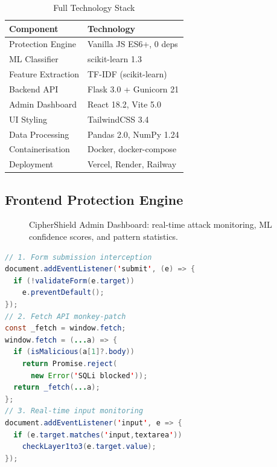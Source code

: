 \documentclass[10pt,twocolumn]{article}
\begin{document}
\begin{table}[H]
\centering
\caption{Full Technology Stack}
\label{tab:stack}
\small
\setlength{\tabcolsep}{4pt}
\begin{tabular}{@{}ll@{}}
\toprule
\textbf{Component} & \textbf{Technology} \\
\midrule
Protection Engine  & Vanilla JS ES6+, 0 deps \\
ML Classifier      & scikit-learn 1.3 \\
Feature Extraction & TF-IDF (scikit-learn) \\
Backend API        & Flask 3.0 + Gunicorn 21 \\
Admin Dashboard    & React 18.2, Vite 5.0 \\
UI Styling         & TailwindCSS 3.4 \\
Data Processing    & Pandas 2.0, NumPy 1.24 \\
Containerisation   & Docker, docker-compose \\
Deployment         & Vercel, Render, Railway \\
\bottomrule
\end{tabular}
\end{table}

\subsection{Frontend Protection Engine}

\begin{figure}[H]
  \centering
  \caption{CipherShield Admin Dashboard: real-time attack monitoring,
           ML confidence scores, and pattern statistics.}
  \label{fig:frontend}
\end{figure}

\begin{lstlisting}[language=Java, caption={JS interception hooks}]
// 1. Form submission interception
document.addEventListener('submit', (e) => {
  if (!validateForm(e.target))
    e.preventDefault();
});
// 2. Fetch API monkey-patch
const _fetch = window.fetch;
window.fetch = (...a) => {
  if (isMalicious(a[1]?.body))
    return Promise.reject(
      new Error('SQLi blocked'));
  return _fetch(...a);
};
// 3. Real-time input monitoring
document.addEventListener('input', e => {
  if (e.target.matches('input,textarea'))
    checkLayer1to3(e.target.value);
});
\end{lstlisting}
\end{document}
